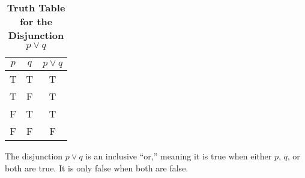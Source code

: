 \begin{table}[h!]
\centering
\caption*{\textbf{Truth Table for the Disjunction $p \lor q$}}
\begin{tabular}{|c|c!{\vrule width 1.5pt}c|}
\hline
{}
\textbf{$p$} & \textbf{$q$} & \textbf{$p \lor q$} \\
\hline
T & T & T \\
T & F & T \\
F & T & T \\
F & F & F \\
\hline
\end{tabular}
\end{table}
\begin{tcolorbox}[colback=white, colframe=gray!60, title=Remark 1 ]
The disjunction $p \lor q$ is an inclusive “or,” meaning it is true when either $p$, $q$, or both are true. It is only false when both are false.
\end{tcolorbox}
